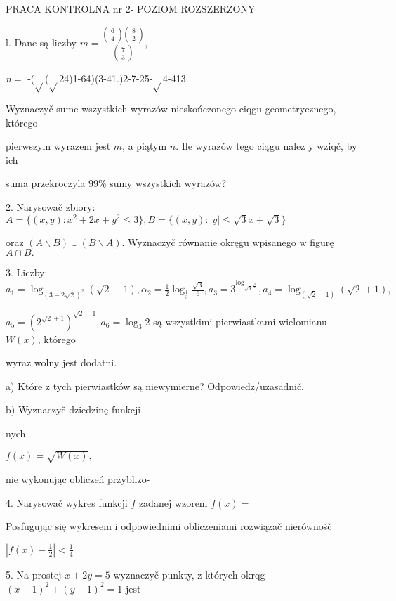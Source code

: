 \documentclass[a4paper,12pt]{article}
\begin{document}
PRACA KONTROLNA nr 2- POZIOM ROZSZERZONY

l. Dane są liczby $m=\displaystyle \frac{\left(\begin{array}{l}
6\\
4
\end{array}\right)\left(\begin{array}{l}
8\\
2
\end{array}\right)}{\left(\begin{array}{l}
7\\
3
\end{array}\right)},$

{\it n}$=$ -($\sqrt{}$($\sqrt{}$24)1-64)(3-41.)2-7-25-$\sqrt{}$4-413.

Wyznaczyč sume wszystkich wyrazów nieskończonego ciqgu geometrycznego, którego

pierwszym wyrazem jest $m$, a piątym $n$. Ile wyrazów tego ciągu nalez $\mathrm{y}$ wziqč, by ich

suma przekroczyla 99\% sumy wszystkich wyrazów?

2. Narysowač zbiory: $A=\{(x,y):x^{2}+2x+y^{2}\leq 3\}, B=\{(x,y):|y|\leq\sqrt{3}x+\sqrt{3}\}$

oraz $(A\backslash B)\cup(B\backslash A)$. Wyznaczyč równanie okręgu wpisanego $\mathrm{w}$ figurę $A\cap B.$

3. Liczby: $a_{1}=\log_{(3-2\sqrt{2})^{2}}(\sqrt{2}-1), \displaystyle \alpha_{2}=\frac{1}{2}\log_{\frac{1}{3}}\frac{\sqrt{3}}{6}, a_{3}=3^{\log_{\sqrt{3}^{\frac{\sqrt{6}}{2}}}}, a_{4}=\log_{(\sqrt{2}-1)}(\sqrt{2}+1),$

$a_{5}=(2^{\sqrt{2}+1})^{\sqrt{2}-1}, a_{6}=\log_{3}2$ są wszystkimi pierwiastkami wielomianu $W(x)$, którego

wyraz wolny jest dodatni.

a) Które $\mathrm{z}$ tych pierwiastków są niewymierne? Odpowiedz/uzasadnič.

b) Wyznaczyč dziedzinę funkcji

nych.

$f(x) = \sqrt{W(x)},$

nie wykonując obliczeń przyblizo-

4. Narysowač wykres funkcji $f$ zadanej wzorem $f(x)=$

Posfugując się wykresem $\mathrm{i}$ odpowiednimi obliczeniami rozwiązač nierównośč

$|f(x)-\displaystyle \frac{1}{2}|<\frac{1}{4}$

5. Na prostej $x+2y=5$ wyznaczyč punkty, $\mathrm{z}$ których okrqg $(x-1)^{2}+(y-1)^{2}=1$ jest
\end{document}
